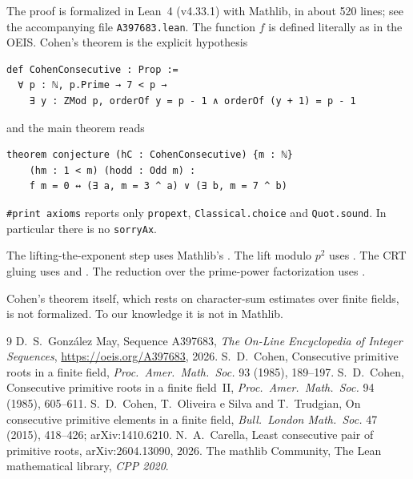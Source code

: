 \documentclass[11pt]{article}
\theoremstyle{remark}
\begin{document}
The proof is formalized in Lean~4 (v4.33.1) with Mathlib, in about 520 lines; see the
accompanying file \texttt{A397683.lean}. The function $f$ is defined literally as in the OEIS.
Cohen's theorem is the explicit hypothesis
\begin{lstlisting}
def CohenConsecutive : Prop :=
  ∀ p : ℕ, p.Prime → 7 < p →
    ∃ y : ZMod p, orderOf y = p - 1 ∧ orderOf (y + 1) = p - 1
\end{lstlisting}
and the main theorem reads
\begin{lstlisting}
theorem conjecture (hC : CohenConsecutive) {m : ℕ}
    (hm : 1 < m) (hodd : Odd m) :
    f m = 0 ↔ (∃ a, m = 3 ^ a) ∨ (∃ b, m = 7 ^ b)
\end{lstlisting}
\texttt{\#print axioms} reports only \texttt{propext}, \texttt{Classical.choice} and
\texttt{Quot.sound}. In particular there is no \texttt{sorryAx}.

The lifting-the-exponent step uses Mathlib's . The lift
modulo $p^2$ uses . The CRT gluing uses
 and . The
reduction over the prime-power factorization uses .

Cohen's theorem itself, which rests on character-sum estimates over finite fields, is not
formalized. To our knowledge it is not in Mathlib.

\begin{thebibliography}{9}
 D.~S.~Gonz\'alez May, Sequence A397683, \emph{The On-Line Encyclopedia of
  Integer Sequences}, \url{https://oeis.org/A397683}, 2026.
 S.~D.~Cohen, Consecutive primitive roots in a finite field,
  \emph{Proc.\ Amer.\ Math.\ Soc.} 93 (1985), 189--197.
 S.~D.~Cohen, Consecutive primitive roots in a finite field~II,
  \emph{Proc.\ Amer.\ Math.\ Soc.} 94 (1985), 605--611.
 S.~D.~Cohen, T.~Oliveira e Silva and T.~Trudgian, On consecutive primitive
  elements in a finite field, \emph{Bull.\ London Math.\ Soc.} 47 (2015), 418--426;
  arXiv:1410.6210.
 N.~A.~Carella, Least consecutive pair of primitive roots,
  arXiv:2604.13090, 2026.
 The mathlib Community, The Lean mathematical library, \emph{CPP 2020}.
\end{thebibliography}
\end{document}
